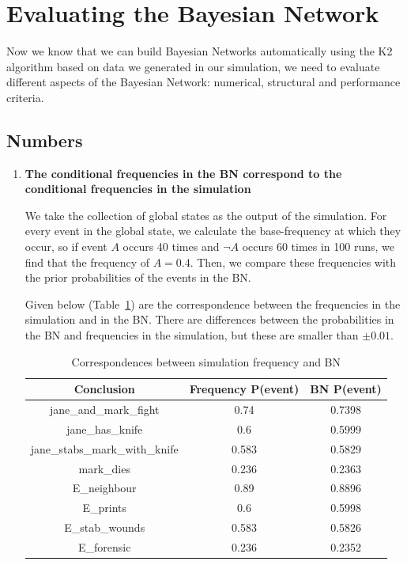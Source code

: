 \section{Evaluating the Bayesian Network}

Now we know that we can build Bayesian Networks automatically using the K2 algorithm based on data we generated in our simulation, we need to evaluate different aspects of the Bayesian Network: numerical, structural and performance criteria.


\subsection{Numbers}
\begin{enumerate}
\item \textbf{The conditional frequencies in the BN correspond to the conditional frequencies in the simulation}

We take the collection of global states as the output of the simulation. For every event in the global state, we calculate the base-frequency at which they occur, so if event $A$ occurs 40 times and $\neg A$ occurs 60 times in 100 runs, we find that the frequency of $A = 0.4$. Then, we compare these frequencies with the prior probabilities of the events in the BN.

Given below (Table~\ref{kids}) are the correspondence between the frequencies in the simulation and in the BN. There are differences between the probabilities in the BN and frequencies in the simulation, but these are smaller than $±0.01$.


\begin{table}[htbp]
\centering
\begin{tabular}{|c|c|c|}
 \hline
 Conclusion & Frequency P(event) & BN P(event)\\
 \hline
jane\_and\_mark\_fight & 0.74 & 0.7398 \\
jane\_has\_knife & 0.6 & 0.5999 \\
jane\_stabs\_mark\_with\_knife & 0.583 & 0.5829 \\
mark\_dies & 0.236 & 0.2363 \\
E\_neighbour & 0.89 & 0.8896 \\
E\_prints & 0.6 & 0.5998 \\
E\_stab\_wounds & 0.583 & 0.5826 \\
E\_forensic & 0.236 & 0.2352\\
\hline
\end{tabular}
\caption{Correspondences between simulation frequency and BN}
\label{kids}
\end{table}




\end{enumerate}

